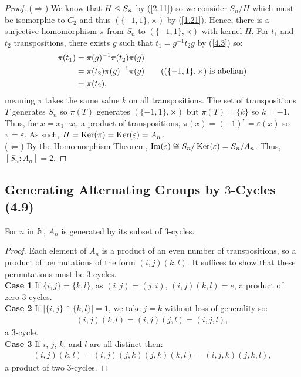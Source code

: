 \begin{proof}
    ($\Longrightarrow$) We know that $H \trianglelefteq S_n$ by (\ref{2.11}) so we consider $S_n / H$ 
    which must be isomorphic to $C_2$ and thus $(\{-1, 1\}, \times)$ by (\ref{1.21}).
    Hence, there is a surjective homomorphism $\pi$ from $S_n$ to $(\{-1, 1\}, \times)$
    with kernel $H$. For $t_1$ and $t_2$ transpositions, there exists $g$ such that 
    $t_1 = g^{-1}t_2g$ by (\ref{4.3}) so: \begin{align*}
        \pi(t_1) 
        &= \pi(g)^{-1}\pi(t_2)\pi(g) \\
        &= \pi(t_2)\pi(g)^{-1}\pi(g) \tag{$(\{-1, 1\}, \times)$ is abelian}\\
        &= \pi(t_2),
    \end{align*} meaning $\pi$ takes the same value $k$ on all transpositions.
    The set of transpositions $T$ generates $S_n$ so $\pi(T)$ generates
    $(\{-1, 1\}, \times)$ but $\pi(T) = \{k\}$ so $k = -1$. Thus,
    for $x = x_1 \cdots x_r$ a product of transpositions, 
    $\pi(x) = (-1)^r = \varepsilon(x)$ so $\pi = \varepsilon$.
    As such, $H = \operatorname{Ker}(\pi) = \operatorname{Ker}(\varepsilon) = A_n$.
    \\[\baselineskip]
    ($\Longleftarrow$) By the Homomorphism Theorem, 
    $\operatorname{Im}(\varepsilon) \cong S_n / \operatorname{Ker}(\varepsilon) = S_n / A_n$.
    Thus, \linebreak $[S_n : A_n] = 2$.
\end{proof}

\subsection{Generating Alternating Groups by $3$-Cycles (4.9)} \label{4.9}

For $n$ in $\mathbb{N}$, $A_n$ is generated by its subset of $3$-cycles.

\begin{proof}
    Each element of $A_n$ is a product of an even number of transpositions,
    so a product of permutations of the form $(i, j)(k, l)$. It suffices
    to show that these permutations must be $3$-cycles.
    \\[\baselineskip]
    \textbf{Case 1} If $\{i, j\} = \{k, l\}$, as $(i, j) = (j, i)$, 
    $(i, j)(k, l) = e$, a product of zero $3$-cycles.
    \\[\baselineskip]
    \textbf{Case 2} If $|\{i, j\} \cap \{k, l\}| = 1$, we take $j = k$
    without loss of generality so: \begin{align*}
        (i, j)(k, l)
        = (i, j)(j, l)
        = (i, j, l),
    \end{align*} a $3$-cycle.
    \\[\baselineskip]
    \textbf{Case 3} If $i$, $j$, $k$, and $l$ are all distinct then: \begin{align*}
        (i, j)(k, l)
        = (i, j)(j, k)(j, k)(k, l)
        = (i, j, k)(j, k, l),
    \end{align*} a product of two $3$-cycles.
\end{proof}
